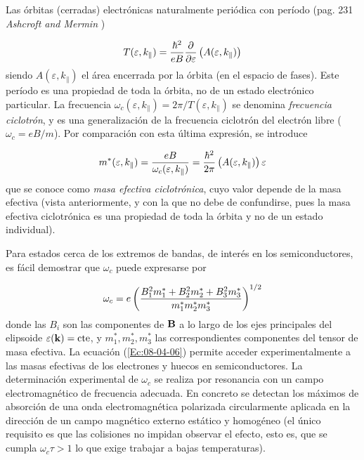 Las órbitas (cerradas) electrónicas naturalmente periódica con período (pag. 231 \textit{Ashcroft and Mermin} \cite{Mermin_Solid_State})

\begin{equation}
	T(\varepsilon,k_\parallel) = \frac{\hbar^2}{eB} \frac{\partial }{\partial \varepsilon}\left( A(\varepsilon,k_\parallel) \right)
\end{equation}
siendo $A(\varepsilon,k_\parallel)$ el área encerrada por la órbita (en el espacio de fases). Este período es una propiedad de toda la órbita, no de un estado electrónico particular. La frecuencia $\omega_c (\varepsilon,k_\parallel)=2\pi/T(\varepsilon,k_\parallel)$ se denomina \textit{frecuencia ciclotrón}, y es una generalización de la frecuencia ciclotrón del electrón libre ($\omega_c = e B/m$). Por comparación con esta última expresión, se introduce

\begin{equation}
	m^* (\varepsilon,k_\parallel) = \frac{eB}{\omega_c (\varepsilon,k_\parallel)} = \frac{\hbar^2}{2\pi} \left( A(\varepsilon,k_\parallel) \right){\varepsilon}
\end{equation}
que se conoce como \textit{masa efectiva ciclotrónica}, cuyo valor depende de la masa efectiva (vista anteriormente, y con la que no debe de confundirse, pues la masa efectiva ciclotrónica es una propiedad de toda la órbita y no de un estado individual).

Para estados cerca de los extremos de bandas, de interés en los semiconductores, es fácil demostrar que $\omega_c$ puede expresarse por

\begin{equation}
	\omega_c = e \left( \frac{B_1^2 m_1^* + B_2^2 m_2^* + B_3^2 m_3^*}{m_1^* m_2^* m_3^*} \right)^{1/2} \label{Ec:03-04-06}
\end{equation}
donde las $B_i$ son las componentes de $\mathbf{B}$ a lo largo de los ejes principales del elipsoide $\varepsilon(\mathbf{k}) = \text{cte}$, y $m_1^*,m_2^*,m_3^*$ las correspondientes componentes del tensor de masa efectiva. La ecuación (\ref{Ec:08-04-06}) permite acceder experimentalmente a las masas efectivas de los electrones y huecos en semiconductores. La determinación experimental de $\omega_c$  se realiza por resonancia con un campo electromagnético de frecuencia adecuada. En concreto se detectan los máximos de absorción de una onda electromagnética polarizada circularmente aplicada en la dirección de un campo magnético externo estático y homogéneo (el único requisito es que las colisiones no impidan observar el efecto, esto es, que se cumpla $\omega_c \tau > 1$ lo que exige trabajar a bajas temperaturas).

